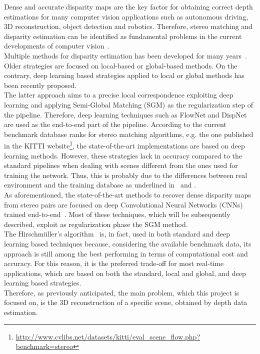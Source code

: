 Dense and accurate disparity maps are the key factor for obtaining correct depth estimations for many computer vision applications such as autonomous driving, 3D reconstruction, object detection and robotics.  
Therefore, stereo matching and disparity estimation can be identified as fundamental problems in the current developments of computer vision~\cite{Seki2017}.\\
Multiple methods for disparity estimation has been developed for many years~\cite{Scharstein2001}. 
Older strategies are focused on local-based or global-based methods. 
On the contrary, deep learning based strategies applied to local or global methods has been recently proposed. \\
The latter approach aims to a precise local correspondence exploiting deep learning and applying Semi-Global Matching (SGM) as the regularization step of the pipeline. 
Therefore, deep learning techniques such as FlowNet and DispNet~\cite{Seki2017} are used as the end-to-end part of the pipeline.
According to the current benchmark database ranks for stereo matching algorithms, e.g. the one published in the KITTI website\footnote{\url{http://www.cvlibs.net/datasets/kitti/eval_scene_flow.php?benchmark=stereo}}, the state-of-the-art implementations are based on deep learning methods. 
However, these strategies lack in accuracy compared to the standard pipelines when dealing with scenes different from the ones used for training the network. 
Thus, this is probably due to the differences between real environment and the training database as underlined in~\cite{Seki2017} and \cite{Poggi2019}.\\
As aforementioned, the state-of-the-art methods to recover dense disparity maps from stereo pairs are focused on deep Convolutional Neural Networks (CNNs) trained end-to-end~\cite{Tonioni2020}. 
Most of these techniques, which will be subsequently described, exploit as regularization phase the SGM method.\\
The Hirschm\"{u}ller's algorithm~\cite{Hirschmuller2008} is, in fact, used in both standard and deep learning based techniques because, considering the available benchmark data, its approach is still among the best performing in terms of computational cost and accuracy. 
For this reason, it is the preferred trade-off for most real-time applications, which are based on both the standard, local and global, and deep learning based strategies.\\
Therefore, as previously anticipated, the main problem, which this project is focused on, is the 3D reconstruction of a specific scene, obtained by depth data estimation.
